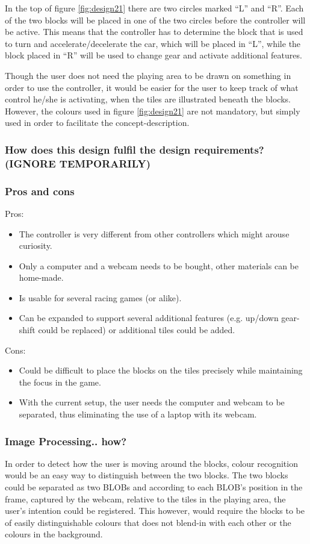 In the top of figure \ref{fig:design21} there are two circles marked “L” and “R”. Each of the two blocks will be placed in one of the two circles before the controller will be active. This means that the controller has to determine the block that is used to turn and accelerate/decelerate the car, which will be placed in “L”, while the block placed in “R” will be used to change gear and activate additional features.

Though the user does not need the playing area to be drawn on something in order to use the controller, it would be easier for the user to keep track of what control he/she is activating, when the tiles are illustrated beneath the blocks. However, the colours used in figure \ref{fig:design21} are not mandatory, but simply used in order to facilitate the concept-description.

\subsubsection*{How does this design fulfil the design requirements? (IGNORE TEMPORARILY)}

\subsubsection*{Pros and cons}
Pros:
\begin{itemize}
\item The controller is very different from other controllers which might arouse curiosity.
\item Only a computer and a webcam needs to be bought, other materials can be home-made.
\item Is usable for several racing games (or alike).
\item Can be expanded to support several additional features (e.g. up/down gear-shift could be replaced) or additional tiles could be added.
\end{itemize}
Cons:
\begin{itemize}
\item Could be difficult to place the blocks on the tiles precisely while maintaining the focus in the game.
\item With the current setup, the user needs the computer and webcam to be separated, thus eliminating the use of a laptop with its webcam.
\end{itemize}

\subsubsection*{Image Processing.. how?}
In order to detect how the user is moving around the blocks, colour recognition would be an easy way to distinguish between the two blocks. The two blocks could be separated as two BLOBs and according to each BLOB’s position in the frame, captured by the webcam, relative to the tiles in the playing area, the user’s intention could be registered. This however, would require the blocks to be of easily distinguishable colours that does not blend-in with each other or the colours in the background.